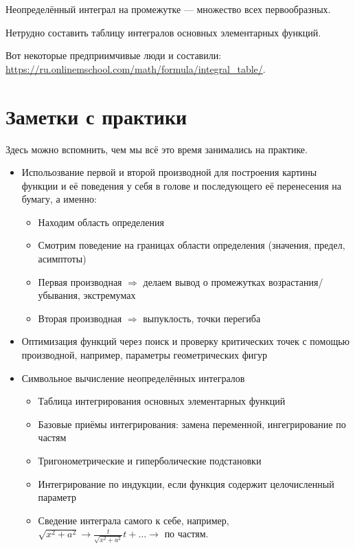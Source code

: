 \documentclass[12pt, a4paper]{article}
\begin{document}
  Неопределённый интеграл на промежутке — множество всех первообразных.

  Нетрудно составить таблицу интегралов основных элементарных функций.
  
  Вот некоторые предприимчивые люди и составили: \url{https://ru.onlinemschool.com/math/formula/integral_table/}.


  
  \section{Заметки с практики}\label{practice-notes}

  Здесь можно вспомнить, чем мы всё это время занимались на практике.

  \begin{itemize}
    \item Испольозвание первой и второй производной для построения картины функции и её поведения 
    у себя в голове и последующего её перенесения на бумагу, а именно:
    \begin{itemize}
      \item Находим область определения
      \item Смотрим поведение на границах области определения (значения, предел, асимптоты)
      \item Первая производная $\Longrightarrow$ делаем вывод о промежутках возрастания/убывания, экстремумах
      \item Вторая производная $\Longrightarrow$ выпуклость, точки перегиба
    \end{itemize}
    \item Оптимизация функций через поиск и проверку критических точек с помощью производной, например, параметры геометрических фигур
    \item Символьное вычисление неопределённых интегралов
    \begin{itemize}
      \item Таблица интегрирования основных элементарных функций
      \item Базовые приёмы интегрирования: замена переменной, ингегрирование по частям
      \item Тригонометрические и гиперболические подстановки
      \item Интегрирование по индукции, если функция содержит целочисленный параметр
      \item Сведение интеграла самого к себе, например, $\sqrt{x^2 + a^2} \rightarrow \frac{t}{\sqrt{x^2 + a^2}} t + \ldots \rightarrow$ по частям.

\end{itemize}
\end{itemize}
\end{document}

